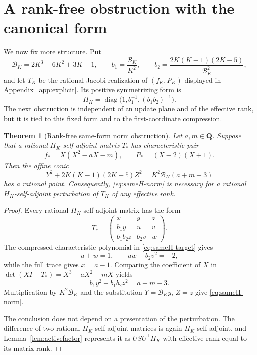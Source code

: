 \documentclass[11pt,reqno]{amsart}
\newtheorem{theorem}{Theorem}[section]
\theoremstyle{definition}
\theoremstyle{remark}
\newcommand{\Q}{\mathbf Q}
\begin{document}
\section{A rank-free obstruction with the canonical form}

We now fix more structure.  Put
\begin{equation}\label{eq:canonical-b}
 \mathcal B_K=2K^3-6K^2+3K-1,\qquad
 b_1=\frac{\mathcal B_K}{K^2},\qquad
 b_2=\frac{2K(K-1)(2K-5)}{\mathcal B_K^2},
\end{equation}
and let $T_K$ be the rational Jacobi realization of $(f_K,P_K)$ displayed
in Appendix~\ref{app:explicit}.  Its positive symmetrizing form is
\begin{equation}\label{eq:canonical-H}
 H_K=\operatorname{diag}\bigl(1,b_1^{-1},(b_1b_2)^{-1}\bigr).
\end{equation}
The next obstruction is independent of an update plane and of the effective
rank, but it is tied to this fixed form and to the first-coordinate
compression.

\begin{theorem}[Rank-free same-form norm obstruction]
\label{thm:sameH-norm}
Let $a,m\in\Q$.  Suppose that a rational $H_K$-self-adjoint matrix $T_*$
has characteristic pair
\begin{equation}\label{eq:sameH-target}
 f_*=X(X^2-aX-m),\qquad P_*=(X-2)(X+1).
\end{equation}
Then the affine conic
\begin{equation}\label{eq:sameH-norm}
 Y^2+2K(K-1)(2K-5)Z^2
   =K^2\mathcal B_K(a+m-3)
\end{equation}
has a rational point.  Consequently, \eqref{eq:sameH-norm} is necessary for
a rational $H_K$-self-adjoint perturbation of $T_K$ of any effective rank.
\end{theorem}

\begin{proof}
Every rational $H_K$-self-adjoint matrix has the form
\[
 T_*=\begin{pmatrix}
 x&y&z\\
 b_1y&u&v\\
 b_1b_2z&b_2v&w
 \end{pmatrix}.
\]
The compressed characteristic polynomial in \eqref{eq:sameH-target} gives
\[
 u+w=1,\qquad uw-b_2v^2=-2,
\]
while the full trace gives $x=a-1$.  Comparing the coefficient of $X$ in
$\det(XI-T_*)=X^3-aX^2-mX$ yields
\[
 b_1y^2+b_1b_2z^2=a+m-3.
\]
Multiplication by $K^2\mathcal B_K$ and the substitution
$Y=\mathcal B_Ky$, $Z=z$ give \eqref{eq:sameH-norm}.

The conclusion does not depend on a presentation of the perturbation.  The
difference of two rational $H_K$-self-adjoint matrices is again
$H_K$-self-adjoint, and Lemma~\ref{lem:activefactor} represents it as
$USU^{\mathsf T}H_K$ with effective rank equal to its matrix rank.
\end{proof}
\end{document}
